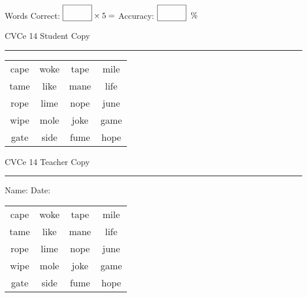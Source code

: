 \documentclass{memoir}
\begin{document}
\small

Words Correct: $\fbox{\phantom{\huge 100}} \times 5 = $ Accuracy: $\fbox{\phantom{\huge 100}}\;\; \%$ 

\vfill

\newpage


\footnotesize \noindent
CVCe 14 \hfill Student Copy
\smallskip
\hrule

\Large

\setlength{\tabcolsep}{14pt}
\def\arraystretch{2}

{\selectfont


\begin{vplace}[0.5]
\begin{center}
\begin{tabular}{cccc}
cape & woke & tape & mile \\
tame & like & mane & life \\
rope & lime & nope & june \\
wipe & mole & joke & game \\
gate & side & fume & hope \\
\end{tabular}
\end{center}
\end{vplace}

}

\newpage

\footnotesize \noindent
CVCe 14 \hfill Teacher Copy
\smallskip
\hrule

\small

\vfill

\noindent
Name: \underline{\hspace{1.75in}} \hfill Date: \underline{\hspace{1in}}

\Large

{\selectfont


\begin{vplace}[0.5]
\begin{center}
\begin{tabular}{cccc}
cape & woke & tape & mile \\
tame & like & mane & life \\
rope & lime & nope & june \\
wipe & mole & joke & game \\
gate & side & fume & hope \\
\end{tabular}
\end{center}
\end{vplace}



}
\end{document}
